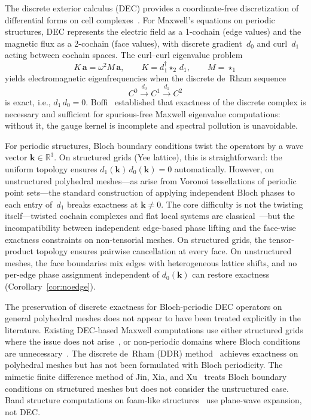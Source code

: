 \documentclass[preprint,12pt]{elsarticle}
\begin{document}
The discrete exterior calculus (DEC) provides a coordinate-free discretization of differential forms on cell complexes~\cite{Hirani2003,Desbrun2005}. For Maxwell's equations on periodic structures, DEC represents the electric field as a 1-cochain (edge values) and the magnetic flux as a 2-cochain (face values), with discrete gradient~$d_0$ and curl~$d_1$ acting between cochain spaces. The curl--curl eigenvalue problem
\begin{equation}\label{eq:curlcurl}
  K\,\mathbf{a} = \omega^2 M\,\mathbf{a}, \qquad
  K = d_1^\dagger \star_2\, d_1, \qquad M = \star_1
\end{equation}
yields electromagnetic eigenfrequencies when the discrete de~Rham sequence
\begin{equation}\label{eq:derham}
  C^0 \xrightarrow{d_0} C^1 \xrightarrow{d_1} C^2
\end{equation}
is exact, i.e., $d_1\,d_0 = 0$. Boffi~\cite{Boffi2010} established that exactness of the discrete complex is necessary and sufficient for spurious-free Maxwell eigenvalue computations: without it, the gauge kernel is incomplete and spectral pollution is unavoidable.

For periodic structures, Bloch boundary conditions twist the operators by a wave vector $\mathbf{k} \in \mathbb{R}^3$. On structured grids (Yee lattice), this is straightforward: the uniform topology ensures $d_1(\mathbf{k})\,d_0(\mathbf{k}) = 0$ automatically. However, on unstructured polyhedral meshes---as arise from Voronoi tessellations of periodic point sets---the standard construction of applying independent Bloch phases to each entry of~$d_1$ breaks exactness at $\mathbf{k} \neq 0$. The core difficulty is not the twisting itself---twisted cochain complexes and flat local systems are classical~\cite{Bott1982}---but the incompatibility between independent edge-based phase lifting and the face-wise exactness constraints on non-tensorial meshes. On structured grids, the tensor-product topology ensures pairwise cancellation at every face. On unstructured meshes, the face boundaries mix edges with heterogeneous lattice shifts, and no per-edge phase assignment independent of $d_0(\mathbf{k})$ can restore exactness (Corollary~\ref{cor:noedge}).

The preservation of discrete exactness for Bloch-periodic DEC operators on general polyhedral meshes does not appear to have been treated explicitly in the literature. Existing DEC-based Maxwell computations use either structured grids where the issue does not arise~\cite{Teixeira1999}, or non-periodic domains where Bloch conditions are unnecessary~\cite{Chen2017}. The discrete de~Rham (DDR) method~\cite{DiPietro2020} achieves exactness on polyhedral meshes but has not been formulated with Bloch periodicity. The mimetic finite difference method of Jin, Xia, and Xu~\cite{Jin2025} treats Bloch boundary conditions on structured meshes but does not consider the unstructured case. Band structure computations on foam-like structures~\cite{Klatt2019} use plane-wave expansion, not DEC.
\end{document}
